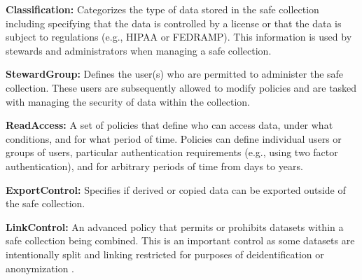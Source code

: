 \textbf{Classification:} Categorizes the type of data stored in the
safe collection including specifying that the data is controlled by
a license or that the data is subject to regulations (e.g., HIPAA or FEDRAMP).
This information is used by stewards and administrators when
managing a safe collection.

\textbf{StewardGroup:} Defines the user(s) who are permitted to
administer the safe collection. These users are subsequently
allowed to modify policies and are tasked with managing the
security of data within the collection.

\textbf{ReadAccess:} A set of policies that define who can
access data, under what conditions, and for what period of time.
Policies can define individual users or groups of users, particular
authentication requirements (e.g., using two factor authentication),
and for arbitrary periods of time from days to years.

\textbf{ExportControl:} Specifies if derived or copied data
can be exported outside of the safe collection.

\textbf{LinkControl:} An advanced policy that permits
or prohibits datasets within a safe collection being
combined. This is an important control as some datasets
are intentionally split and linking restricted for purposes
of deidentification or anonymization .




